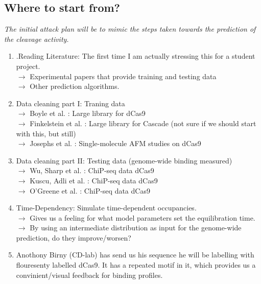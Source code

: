 \documentclass[a4paper,twoside]{revtex4-1}
\begin{document}
\subsection{Where to start from?}
\textit{The initial attack plan will be to mimic the steps taken towards the prediction of the cleavage activity.}
\begin{enumerate}
\item .Reading Literature: The first time I am actually stressing this for a student project. \\
$\rightarrow$ Experimental papers that provide training and testing data \\
$\rightarrow$ Other prediction algorithms.  
\item  Data cleaning part I: Traning data \\
$\rightarrow$ Boyle et al. : Large library for dCas9 \\
$\rightarrow$ Finkelstein et al. : Large library for Cascade (not sure if we should start with this, but still) \\
$\rightarrow$ Josephs et al. : Single-molecule AFM studies on dCas9 
\item Data cleaning part II: Testing data (genome-wide binding measured) \\
$\rightarrow$ Wu, Sharp et al. : ChiP-seq data dCas9 \\
$\rightarrow$ Kuscu, Adli et al. : ChiP-seq data dCas9 \\
$\rightarrow$ O'Greene et al. : ChiP-seq data dCas9 
\item Time-Dependency: Simulate time-dependent occupancies.\\
$\rightarrow$ Gives us a feeling for what model parameters set the equilibration time.\\
$\rightarrow$ By using an intermediate distribution as input for the genome-wide prediction, do they improve/worsen?
\item Anothony Birny (CD-lab) has send us his sequence he will be labelling with flouresenty labelled dCas9. It has a repeated motif in it, which provides us a convinient/visual feedback for binding profiles.

 
\end{enumerate}
\end{document}
